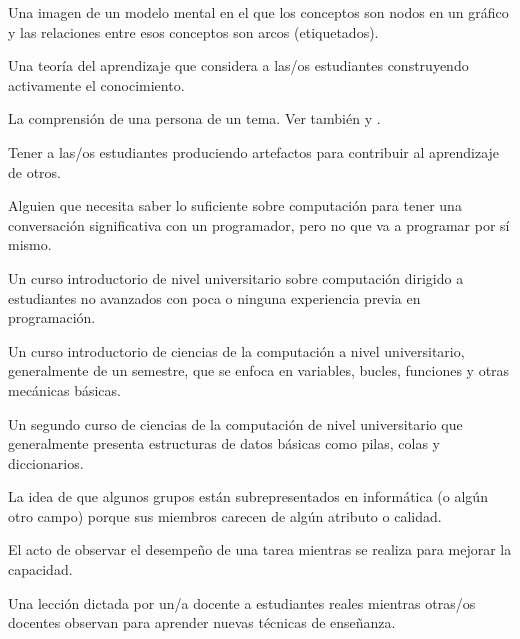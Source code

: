 \begin{description}
 Una imagen de un modelo mental en el que 
los conceptos son nodos en un gráfico y las relaciones entre esos conceptos son arcos (etiquetados).



 Una teoría del aprendizaje que considera a 
las/os estudiantes construyendo activamente el conocimiento.

 La comprensión de una 
persona de un tema. Ver también
y .

 Tener a las/os estudiantes
produciendo artefactos para contribuir al aprendizaje de otros.

 Alguien que necesita saber
lo suficiente sobre computación para tener una conversación significativa con un programador, 
pero no que va a programar por sí mismo.



 Un curso introductorio de nivel universitario sobre computación 
dirigido a estudiantes no avanzados con poca o ninguna experiencia previa en programación.

 Un curso introductorio de ciencias de la computación a nivel universitario, 
generalmente de un semestre, que se enfoca en variables, bucles, funciones y otras mecánicas básicas.

 Un segundo curso de ciencias de la computación de nivel universitario 
que generalmente presenta estructuras de datos básicas como pilas, colas y diccionarios.

 La idea de que algunos grupos 
están subrepresentados en informática (o algún otro campo) porque sus miembros 
carecen de algún atributo o calidad.

 El acto de observar el desempeño 
de una tarea mientras se realiza para mejorar la capacidad.

 Una lección dictada por un/a docente a estudiantes reales 
mientras otras/os docentes observan para aprender nuevas técnicas de enseñanza.


\end{description}
